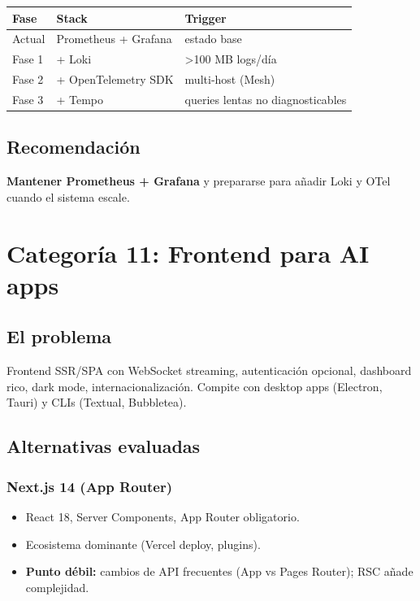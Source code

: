 \documentclass[11pt,a4paper]{article}
\begin{document}
\begin{center}
\begin{tabular}{|l|l|l|}
\hline
\rowcolor{sotared}\color{white}\textbf{Fase} & \color{white}\textbf{Stack} & \color{white}\textbf{Trigger}\\
\hline
Actual & Prometheus + Grafana & estado base\\
Fase 1 & + Loki & \textgreater 100 MB logs/día\\
Fase 2 & + OpenTelemetry SDK & multi-host (Mesh)\\
Fase 3 & + Tempo & queries lentas no diagnosticables\\
\hline
\end{tabular}
\end{center}

\subsection{Recomendación}

\textbf{Mantener Prometheus + Grafana} y prepararse para añadir Loki y OTel cuando el sistema escale.

\newpage

\section{Categoría 11: Frontend para AI apps}

\subsection{El problema}

Frontend SSR/SPA con WebSocket streaming, autenticación opcional, dashboard rico, dark mode, internacionalización. Compite con desktop apps (Electron, Tauri) y CLIs (Textual, Bubbletea).

\subsection{Alternativas evaluadas}

\subsubsection{Next.js 14 (App Router)}
\begin{itemize}[leftmargin=*,itemsep=0pt]
\item React 18, Server Components, App Router obligatorio.
\item Ecosistema dominante (Vercel deploy, plugins).
\item \textbf{Punto débil:} cambios de API frecuentes (App vs Pages Router); RSC añade complejidad.
\end{itemize}
\end{document}
